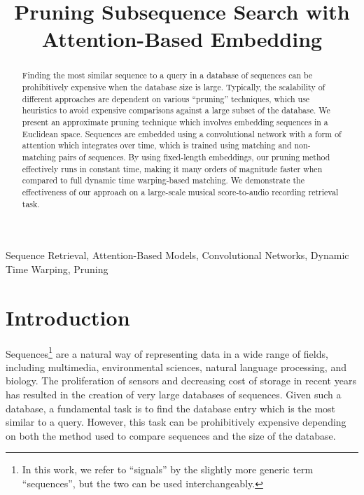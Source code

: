 \documentclass{article}
\title{Pruning Subsequence Search with Attention-Based Embedding}
\begin{document}
\ninept
\maketitle

\begin{abstract}
Finding the most similar sequence to a query in a database of sequences can be prohibitively expensive when the database size is large.
Typically, the scalability of different approaches are dependent on various ``pruning'' techniques, which use heuristics to avoid expensive comparisons against a large subset of the database.
We present an approximate pruning technique which involves embedding sequences in a Euclidean space.
Sequences are embedded using a convolutional network with a form of attention which integrates over time, which is trained using matching and non-matching pairs of sequences.
By using fixed-length embeddings, our pruning method effectively runs in constant time, making it many orders of magnitude faster when compared to full dynamic time warping-based matching.
We demonstrate the effectiveness of our approach on a large-scale musical score-to-audio recording retrieval task.
\end{abstract}

\begin{keywords}
Sequence Retrieval, Attention-Based Models, Convolutional Networks, Dynamic Time Warping, Pruning
\end{keywords}

\section{Introduction}
\label{sec:intro}

Sequences\footnote{In this work, we refer to ``signals'' by the slightly more generic term ``sequences'', but the two can be used interchangeably.} are a natural way of representing data in a wide range of fields, including multimedia, environmental sciences, natural language processing, and biology.
The proliferation of sensors and decreasing cost of storage in recent years has resulted in the creation of very large databases of sequences.
Given such a database, a fundamental task is to find the database entry which is the most similar to a query.
However, this task can be prohibitively expensive depending on both the method used to compare sequences and the size of the database.
\end{document}

